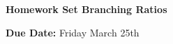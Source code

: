 


\thispagestyle{fancy}






\begin{center}
{\huge \textbf{Homework Set Branching Ratios }}
\large

{\textbf{ Due Date:} Friday March 25th  } 
\end{center}

